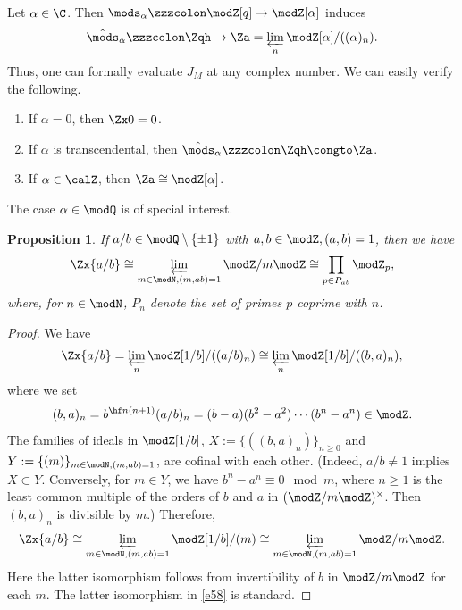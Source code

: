 \documentclass{amsart}
\numberwithin{equation}{section}
\numberwithin{figure}{section}
\theoremstyle{plain}
\newtheorem{proposition}[theorem]{Proposition}
\theoremstyle{definition}
\theoremstyle{remark}
\begin{document}
Let $\alpha \in \C$.  Then $\mods _\alpha \zzzcolon \modZ [q]\rightarrow \modZ [\alpha ]$ induces
\begin{equation*}
  \hat{\mods }_\alpha \zzzcolon \Zqh\rightarrow \Za=\varprojlim_{n} \modZ [\alpha ]/((\alpha )_n).
\end{equation*}
Thus, one can formally evaluate $J_M$ at any complex number.  We can
easily verify the following.
\begin{enumerate}
\item If $\alpha =0$, then $\Zx0=0$.
\item If $\alpha $ is transcendental, then $\hat{\mods }_\alpha \zzzcolon \Zqh\congto\Za$.
\item If $\alpha \in \calZ$, then $\Za\cong\modZ [\alpha ]$.
\end{enumerate}

The case $\alpha \in \modQ $ is of special interest.
\begin{proposition}
  \label{r12}
  If $a/b\in \modQ \setminus \{\pm 1\}$ with $a,b\in \modZ ,(a,b)=1$, then we have
  \begin{equation}
    \label{e58}
    \Zx{a/b}
    \cong \varprojlim_{m\in \modN ,(m,ab)=1}\modZ /m\modZ 
    \cong \prod_{p\in P_{ab}}\modZ _p,
  \end{equation}
  where, for $n\in \modN $, $P_n$ denote the set of primes $p$ coprime with
  $n$.
\end{proposition}

\begin{proof}
  We have
  \begin{equation*}
    \begin{split}
      \Zx{a/b}
      =\varprojlim_{n}\modZ [1/b]/((a/b)_n)
      \cong\varprojlim_{n}\modZ [1/b]/((b,a)_n),
    \end{split}
  \end{equation*}
  where we set
  \begin{equation*}
    (b,a)_n = b^{\hf n(n+1)}(a/b)_n =(b-a)(b^2-a^2)\cdots(b^n-a^n)\in \modZ .
  \end{equation*}
  The families of ideals in $\modZ [1/b]$, $X:=\{((b,a)_n)\}_{n\ge 0}$ and
  $Y:=\{(m)\}_{m\in \modN ,(m,ab)=1}$, are cofinal with each other.
  (Indeed, $a/b\neq1$ implies $X\subset Y$.  Conversely, for $m\in Y$, we
  have $b^n-a^n\equiv0\mod m$, where $n\ge 1$ is the least common
  multiple of the orders of $b$ and $a$ in $(\modZ /m\modZ )^\times $.  Then
  $(b,a)_n$ is divisible by $m$.)  Therefore,
  \begin{equation*}
    \begin{split}
      \Zx{a/b}
      \cong \varprojlim_{m\in \modN ,(m,ab)=1}\modZ [1/b]/(m)
      \cong \varprojlim_{m\in \modN ,(m,ab)=1}\modZ /m\modZ .
    \end{split}
  \end{equation*}
  Here the latter isomorphism follows from invertibility of $b$ in
  $\modZ /m\modZ $ for each $m$.  The latter isomorphism in \eqref{e58} is
  standard.
\end{proof}
\end{document}
